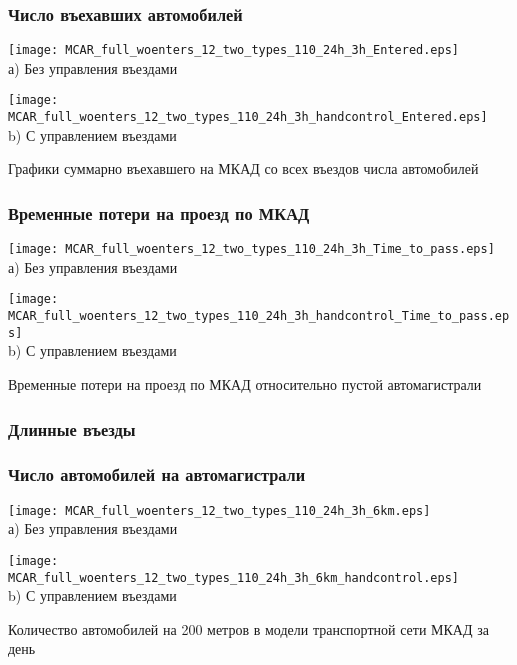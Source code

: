 \begin{frame}
    \frametitle{Число въехавших автомобилей}
    \centering
    \begin{minipage}[b]{.49\textwidth}
        \centering
        \texttt{[image: MCAR\_full\_woenters\_12\_two\_types\_110\_24h\_3h\_Entered.eps]}  \\ а) Без управления въездами
    \end{minipage}
    \hfill
    \begin{minipage}[b]{.49\textwidth}
        \centering
        \texttt{[image: MCAR\_full\_woenters\_12\_two\_types\_110\_24h\_3h\_handcontrol\_Entered.eps]}  \\ b) С управлением въездами
    \end{minipage}
    \hfill
    Графики суммарно въехавшего на МКАД со всех въездов числа автомобилей
\end{frame}


\begin{frame}
    \frametitle{Временные потери на проезд по МКАД}
    \centering
    \begin{minipage}[b]{.49\textwidth}
        \centering
        \texttt{[image: MCAR\_full\_woenters\_12\_two\_types\_110\_24h\_3h\_Time\_to\_pass.eps]}  \\ а) Без управления въездами
    \end{minipage}
    \hfill
    \begin{minipage}[b]{.49\textwidth}
        \centering
        \texttt{[image: MCAR\_full\_woenters\_12\_two\_types\_110\_24h\_3h\_handcontrol\_Time\_to\_pass.eps]}  \\ b) С управлением въездами
    \end{minipage}
    \hfill
    Временные потери на проезд по МКАД относительно пустой автомагистрали
\end{frame}

\subsubsection{Длинные въезды}
\begin{frame}
    \frametitle{Число автомобилей на автомагистрали}
    \centering
    \begin{minipage}[b]{0.49\textwidth}
        \centering
        \texttt{[image: MCAR\_full\_woenters\_12\_two\_types\_110\_24h\_3h\_6km.eps]}  \\ а) Без управления въездами
    \end{minipage}
    \hfill
    \begin{minipage}[b]{0.49\textwidth}
        \centering
        \texttt{[image: MCAR\_full\_woenters\_12\_two\_types\_110\_24h\_3h\_6km\_handcontrol.eps]}  \\ b) С управлением въездами
    \end{minipage}
    \hfill
    Количество автомобилей на 200 метров в модели транспортной сети МКАД за день
\end{frame}


